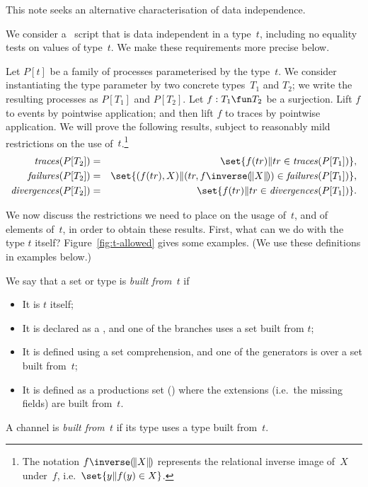 
This note seeks an alternative characterisation of data independence.

We consider a \CSPm\ script that is data independent in a type~$t$, including
no equality tests on values of type~$t$.  We make these requirements more
precise below.

Let $P[t]$ be a family of processes parameterised by the type~$t$.  We
consider instantiating the type parameter by two concrete types~$T_1$ and
$T_2$; we write the resulting processes as $P[T_1]$ and $P[T_2]$.  Let $f: T_1
\fun T_2$ be a surjection.  Lift $f$ to events by pointwise application; and
then lift $f$ to traces by pointwise application.  We will prove the following
results, subject to reasonably mild restrictions on the use
of~$t$.\footnote{The notation $f\inverse \banana{X}$ represents the relational
inverse image of~$X$ under~$f$, i.e.~$\set{y \| f(y) \in X}$.}
%
\begin{eqnarray}
\traces(P[T_2]) & = & \set{f(tr) \| tr \in \traces(P[T_1])},
  \label{eqn:traces} \\
\failures(P[T_2]) & = &
  \set{(f(tr), X) \| (tr, f\inverse \banana{X}) \in \failures(P[T_1])},
  \label{eqn:failures} \\
\divergences(P[T_2]) & = & \set{f(tr) \| tr \in \divergences(P[T_1])}.
\end{eqnarray}


We now discuss the restrictions we need to place on the usage of~$t$, and of
elements of~$t$, in order to obtain these results.  First, what can we do with
the type $t$ itself?  Figure~\ref{fig:t-allowed} gives some examples.  (We use
these definitions in examples below.)
\framebox{\ldots} 

\begin{definition}
We say that a set or type is \emph{built from~$t$} if
%
\begin{itemize}
\item It is $t$ itself;

\item It is declared as a , and one of the branches uses a set
  built from $t$;

\item It is defined using a set comprehension, and one of the generators is
  over a set built from~$t$;

\item It is defined as a productions set () where the
extensions (i.e.~the missing fields)  are built from~$t$.
\end{itemize}
%
A channel is \emph{built from~$t$} if its type uses a type built from~$t$.
\end{definition}
 
